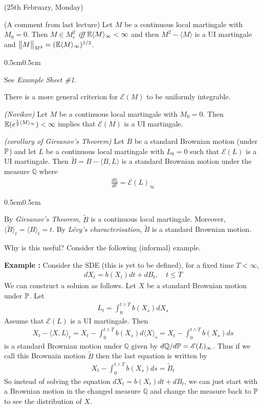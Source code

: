 \documentclass[12pt,a4paper]{article}
\newenvironment{proof}
{\begin{changemargin}{0.5cm}{0.5cm} 
	}%
	{\end{changemargin}
}
\newenvironment{p}
{\begin{proof} 
	}%
	{\end{proof}
}
\begin{document}
(25th February, Monday)
\s

(A comment from last lecture) \prop Let $M$ be a continuous local martingale with $M_0 =0$. Then $M \in M_c^2$ \emph{iff} $\mathbb{E} \langle M \rangle_{\infty} < \infty$ and then $M^2 - \langle M \rangle$ is a UI martingale and $\bigl\lVert M\bigr\rVert_{M^2} = (\mathbb{E} \langle M \rangle_{\infty})^{1/2}$.
\begin{p}
\pf See \emph{Example Sheet \#1}.
\end{p}
\s

There is a more general criterion for $\mathscr{E}(M)$ to be uniformly integrable.
\s

\thm \emph{(Novikov)} Let $M$ be a continuous local martingale with $M_0 = 0$. Then $\mathbb{E} (e^{\frac{1}{2} \langle M \rangle_{\infty}})< \infty$ implies that $\mathscr{E}(M)$ is a UI martingale.
\s

\corr \emph{(corollary of Girsanov's Theorem)} Let $B$ be a standard Brownian motion (under $\mathbb{P}$) and let $L$ be a continuous local martingale with $L_0 = 0$ such that $\mathscr{E}(L)$ is a UI martingale. Then $\tilde{B} = B- \langle B, L \rangle$ is a standard Brownian motion under the measure $\mathbb{Q}$ where
\begin{align*}
\frac{d\mathbb{Q}}{d\mathbb{P}} = \mathscr{E}(L)_{\infty}
\end{align*}
\begin{p}
\pf By \emph{Girsanov's Theorem}, $\tilde{B}$ is a continuous local martingale. Moreover, $\langle \tilde{B}\rangle_t = \langle B\rangle_t =t$. By \emph{L\'{e}vy's characterisation}, $\tilde{B}$ is a standard Brownian motion.

\eop
\end{p}
\s

Why is this useful? Consider the following (informal) example.
\s

\textbf{Example :} Consider the SDE (this is yet to be defined), for a fixed time $T< \infty$,
\begin{align*}
dX_t =b(X_t) dt + dB_t, \quad t\leq T
\end{align*}
We can construct a soluion as follows. Let $X$ be a standard Brownian motion under $\mathbb{P}$. Let
\begin{align*}
L_t = \int_0^{t\wedge T} b(X_s) dX_s
\end{align*}
Assume that $\mathscr{E}(L)$ is a UI martingale. Then
\begin{align*}
X_t - \langle X, L\rangle_t = X_t - \int_0^{t\wedge T} b(X_s) d\langle X \rangle_s = X_t - \int_0^{t\wedge T} b(X_s) ds
\end{align*}
is a standard Brownian motion under $\mathbb{Q}$ given by $d\mathbb{Q} / d\mathbb{P} = \mathscr{E}(L)_{\infty}$. Thus if we call this Brownain motion $\tilde{B}$ then the last equation is written by
\begin{align*}
X_t - \int_0^{t\wedge T}b(X_s) ds = \tilde{B}_t
\end{align*}
So instead of solving the equation $dX_t = b(X_t) dt + dB_t$, we can just start with a Brownian motion in the changed measure $\mathbb{Q}$ and change the measure back to $\mathbb{P}$ to see the distribution of $X$.
\end{document}
